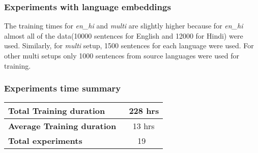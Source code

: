 \subsubsection{Experiments with language embeddings}
\begin{table}[ht]
    \begin{center}
        \caption{Training duration with language embeddings}
        \label{table:experiments_durations_em}
    \end{center}
\end{table}
The training times for \textit{en\_hi} and \textit{multi} are slightly higher
because for \textit{en\_hi} almost all of the data(10000 sentences for English
and 12000 for Hindi) were used. Similarly, for \textit{multi} setup, 1500
sentences for each language were used. For other multi setups only 1000
sentences from source languages were used for training.

\subsubsection{Experiments time summary}
\begin{table}[ht]
    \begin{center}
        \begin{tabular}{|l|c|}
            \hline
            \textbf{Total Training duration} & ~228 hrs \\
            \hline
            \textbf{Average Training duration} & ~13 hrs \\
            \hline
            \textbf{Total experiments} & 19 \\
            \hline
        \end{tabular}
    \end{center}
\end{table}
